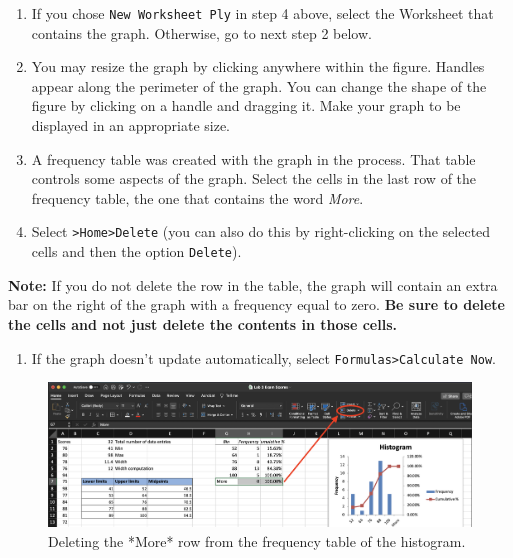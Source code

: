\documentclass[
]{book}
\providecommand{\tightlist}{%
  \setlength{\itemsep}{0pt}\setlength{\parskip}{0pt}}
\begin{document}
\begin{enumerate}
\def\labelenumi{\arabic{enumi}.}
\tightlist
\item
  If you chose \texttt{New\ Worksheet\ Ply} in step 4 above, select the Worksheet that contains the graph. Otherwise, go to next step 2 below.
\item
  You may resize the graph by clicking anywhere within the figure. Handles appear along the perimeter of the graph. You can change the shape of the figure by clicking on a handle and dragging it. Make your graph to be displayed in an appropriate size.
\item
  A frequency table was created with the graph in the process. That table controls some aspects of the graph. Select the cells in the last row of the frequency table, the one that contains the word \emph{More}.
\item
  Select \texttt{\textgreater{}Home\textgreater{}Delete} (you can also do this by right-clicking on the selected cells and then the option \texttt{Delete}).
\end{enumerate}

\textbf{Note:} If you do not delete the row in the table, the graph will contain an extra bar on the right of the graph with a frequency equal to zero. \textbf{Be sure to delete the cells and not just delete the contents in those cells.}

\begin{enumerate}
\def\labelenumi{\arabic{enumi}.}
\setcounter{enumi}{4}
\tightlist
\item
  If the graph doesn't update automatically, select \texttt{Formulas\textgreater{}Calculate\ Now}.
\end{enumerate}

\begin{figure}

{\centering \includegraphics[width=1\linewidth]{delete-more-row} 

}

\caption{Deleting the *More* row from the frequency table of the histogram.}\label{fig:delete-more-row}
\end{figure}
\end{document}
